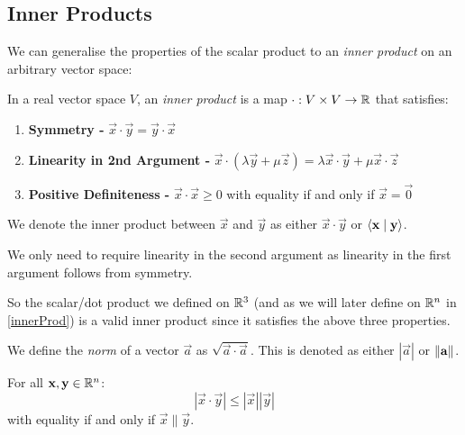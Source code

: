 \documentclass[../main.tex]{subfiles}
\begin{document}
\subsection{Inner Products}
We can generalise the properties of the scalar product to an \textit{inner product} on an arbitrary vector space:
\begin{definition}
  In a real vector space $V$, an \textit{inner product} is a map $\cdot: V \times V \to \mathbb{R}$ that satisfies: \label{innerProductDef}
  \begin{enumerate}
    \item \textbf{Symmetry -} $\vec{x} \cdot \vec{y} = \vec{y} \cdot \vec{x}$
    \item \textbf{Linearity in 2nd Argument -} $\vec{x} \cdot(\lambda \vec{y} + \mu \vec{z}) = \lambda \vec{x} \cdot \vec{y} + \mu \vec{x} \cdot \vec{z}$
    \item \textbf{Positive Definiteness - } $\vec{x} \cdot \vec{x} \geq 0$ with equality if and only if $\vec{x} = \vec{0}$
  \end{enumerate}
  We denote the inner product between $\vec{x}$ and $\vec{y}$ as either $\vec{x} \cdot \vec{y}$ or $\langle \mathbf{\bm{x}} \mid \mathbf{\bm{y}} \rangle$.
\end{definition}
\begin{remark}[Note]
  We only need to require linearity in the second argument as linearity in the first argument follows from symmetry.
\end{remark}
So the scalar/dot product we defined on $\mathbb{R}^3$ (and as we will later define on $\mathbb{R}^{n}$ in \cref{innerProd}) is a valid inner product since it satisfies the above three properties.
\begin{definition}[Norm]
  We define the \textit{norm} of a vector $\vec{a}$ as $\sqrt{\vec{a} \cdot \vec{a}}$.
  This is denoted as either $|\vec{a}|$ or $\left\lVert \mathbf{\bm{a}} \right\rVert$.
\end{definition}
\begin{theorem}
  \label{cauchySchwarz}
  For all $\mathbf{\bm{x}}, \mathbf{\bm{y}} \in \mathbb{R}^{n}$:
  \[
    |\vec{x} \cdot \vec{y}| \leq |\vec{x}||\vec{y}|
  \]
  with equality if and only if $\vec{x} \parallel \vec{y}$.
\end{theorem}
\end{document}
